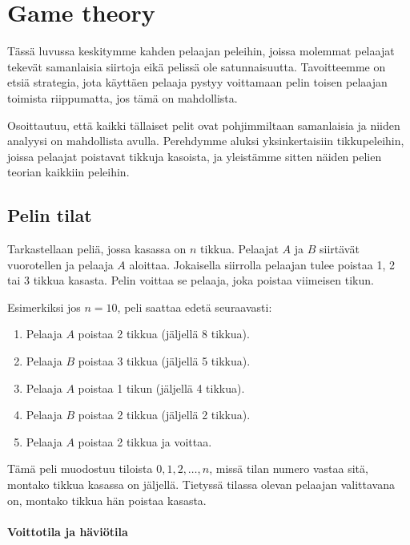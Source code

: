 \chapter{Game theory}

Tässä luvussa keskitymme kahden pelaajan peleihin,
joissa molemmat pelaajat tekevät
samanlaisia siirtoja eikä pelissä ole satunnaisuutta.
Tavoitteemme on etsiä strategia, jota käyttäen
pelaaja pystyy voittamaan pelin toisen pelaajan
toimista riippumatta, jos tämä on mahdollista.

Osoittautuu, että kaikki tällaiset pelit ovat
pohjimmiltaan samanlaisia ja niiden analyysi on
mahdollista  avulla.
Perehdymme aluksi yksinkertaisiin tikkupeleihin,
joissa pelaajat poistavat tikkuja kasoista,
ja yleistämme sitten näiden pelien teorian kaikkiin peleihin.

\section{Pelin tilat}

Tarkastellaan peliä, jossa kasassa on $n$ tikkua.
Pelaajat $A$ ja $B$ siirtävät vuorotellen ja
pelaaja $A$ aloittaa.
Jokaisella siirrolla pelaajan tulee poistaa
1, 2 tai 3 tikkua kasasta.
Pelin voittaa se pelaaja, joka poistaa viimeisen tikun.

Esimerkiksi jos $n=10$, peli saattaa edetä seuraavasti:
\begin{enumerate}[noitemsep]
\item Pelaaja $A$ poistaa 2 tikkua (jäljellä 8 tikkua).
\item Pelaaja $B$ poistaa 3 tikkua (jäljellä 5 tikkua).
\item Pelaaja $A$ poistaa 1 tikun (jäljellä 4 tikkua).
\item Pelaaja $B$ poistaa 2 tikkua (jäljellä 2 tikkua).
\item Pelaaja $A$ poistaa 2 tikkua ja voittaa.
\end{enumerate}
Tämä peli muodostuu tiloista $0,1,2,\ldots,n$,
missä tilan numero vastaa sitä, montako tikkua
kasassa on jäljellä.
Tietyssä tilassa olevan pelaajan valittavana on,
montako tikkua hän poistaa kasasta.

\subsubsection{Voittotila ja häviötila}


